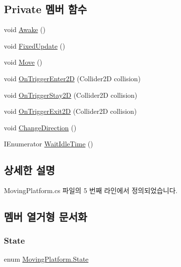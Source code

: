\subsection*{Private 멤버 함수}
\begin{DoxyCompactItemize}
\item 
void \mbox{\hyperlink{class_moving_platform_aec6412bf79a5d4fdec57da2e3b390b93}{Awake}} ()
\item 
void \mbox{\hyperlink{class_moving_platform_a935710333a3a0f0164dad887e8eb7d1c}{Fixed\+Update}} ()
\item 
void \mbox{\hyperlink{class_moving_platform_a6042324f3ff144a49863cd515eabfbbb}{Move}} ()
\item 
void \mbox{\hyperlink{class_moving_platform_ad9ff97c68ae6e8dbf202009afcd139ce}{On\+Trigger\+Enter2D}} (Collider2D collision)
\item 
void \mbox{\hyperlink{class_moving_platform_a65ae3244849025ffa7505d5d77601a89}{On\+Trigger\+Stay2D}} (Collider2D collision)
\item 
void \mbox{\hyperlink{class_moving_platform_aef43c6c16b01647d14cfc0a2c9710729}{On\+Trigger\+Exit2D}} (Collider2D collision)
\item 
void \mbox{\hyperlink{class_moving_platform_a98f73c545d68839bcb755a4b638422b5}{Change\+Direction}} ()
\item 
I\+Enumerator \mbox{\hyperlink{class_moving_platform_abb283e05e71fe1fd320d051fdd580b33}{Wait\+Idle\+Time}} ()
\end{DoxyCompactItemize}


\subsection{상세한 설명}


Moving\+Platform.\+cs 파일의 5 번째 라인에서 정의되었습니다.



\subsection{멤버 열거형 문서화}
\mbox{\label{class_moving_platform_af3735076efde22951ec5f5fed6123acc}} 
\subsubsection{\texorpdfstring{State}{State}}
{\footnotesize\ttfamily enum \mbox{\hyperlink{class_moving_platform_af3735076efde22951ec5f5fed6123acc}{Moving\+Platform.\+State}}\hspace{0.3cm}{\ttfamily [strong]}}

